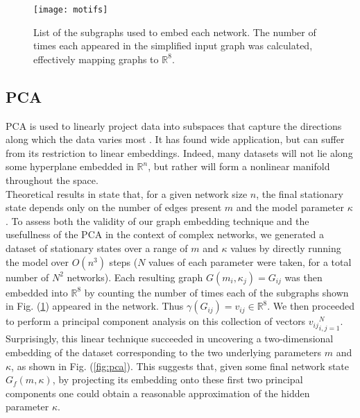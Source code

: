 \documentclass[epjST, final]{svjour}
\begin{document}
\begin{onehalfspace}
\begin{figure}[h!]
  \vspace{-5mm}
  \centering
  \texttt{[image: motifs]}
  \caption{List of the subgraphs used to embed each network. The
    number of times each appeared in the simplified input graph was
    calculated, effectively mapping graphs to $\mathbb{R}^8$. \label{fig:motifs}}
\end{figure}

\subsection{PCA}
\label{sec:pca}

PCA is used to linearly project data into subspaces that capture the
directions along which the data varies most
\cite{jolliffe_principal_2014}. It has found wide application, but
can suffer from its restriction to linear embeddings. Indeed, many
datasets will not lie along some hyperplane embedded in
$\mathbb{R}^n$, but rather will form a nonlinear manifold throughout
the space. \\

Theoretical results in \cite{rath_time_2009} state that, for a given network
size $n$, the final stationary state depends only on the number of
edges present $m$ and the model parameter $\kappa$. To assess both the
validity of our graph embedding technique and the usefullness of the
PCA in the context of complex networks, we generated a dataset of
stationary states over a range of $m$ and $\kappa$ values by directly
running the model over $O(n^3)$ steps ($N$ values of each parameter
were taken, for a total number of $N^2$ networks). Each resulting
graph $G(m_i, \kappa_j) = G_{ij}$ was then embedded into
$\mathbb{R}^8$ by counting the number of times each of the subgraphs
shown in Fig. (\ref{fig:motifs}) appeared in the network. Thus
$\gamma(G_{ij}) = v_{ij} \in \mathbb{R}^8$. We then proceeded to
perform a principal component analysis on this collection of vectors
${v_{ij}}_{i,j=1}^N$. Surprisingly, this linear technique succeeded in
uncovering a two-dimensional embedding of the dataset corresponding to
the two underlying parameters $m$ and $\kappa$, as shown in
Fig. (\ref{fig:pca}). This suggests that, given some final network
state $G_f(m, \kappa)$, by projecting its embedding onto these first two
principal components one could obtain a reasonable approximation of
the hidden parameter $\kappa$.


\end{onehalfspace}
\end{document}
